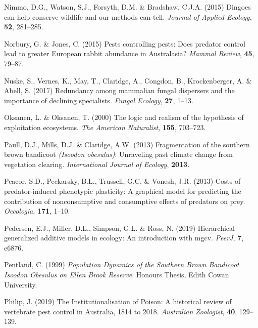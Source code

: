 \documentclass[11pt,a4paper,titlepage,twoside,openright]{style/unimelbthesis}
\begin{document}
\begin{mainmatter}
\leavevmode\hypertarget{ref-nimmo2015dingoes}{}%
Nimmo, D.G., Watson, S.J., Forsyth, D.M. \& Bradshaw, C.J.A. (2015) Dingoes can help conserve wildlife and our methods can tell. \emph{Journal of Applied Ecology}, \textbf{52}, 281--285.

\leavevmode\hypertarget{ref-norbury2015pests}{}%
Norbury, G. \& Jones, C. (2015) Pests controlling pests: Does predator control lead to greater European rabbit abundance in Australasia? \emph{Mammal Review}, \textbf{45}, 79--87.

\leavevmode\hypertarget{ref-nuske2017redundancy}{}%
Nuske, S., Vernes, K., May, T., Claridge, A., Congdon, B., Krockenberger, A. \& Abell, S. (2017) Redundancy among mammalian fungal dispersers and the importance of declining specialists. \emph{Fungal Ecology}, \textbf{27}, 1--13.

\leavevmode\hypertarget{ref-oksanen2000logic}{}%
Oksanen, L. \& Oksanen, T. (2000) The logic and realism of the hypothesis of exploitation ecosystems. \emph{The American Naturalist}, \textbf{155}, 703--723.

\leavevmode\hypertarget{ref-paull2013fragmentation}{}%
Paull, D.J., Mills, D.J. \& Claridge, A.W. (2013) Fragmentation of the southern brown bandicoot \emph{(Isoodon obesulus)}: Unraveling past climate change from vegetation clearing. \emph{International Journal of Ecology}, \textbf{2013}.

\leavevmode\hypertarget{ref-peacor2013costs}{}%
Peacor, S.D., Peckarsky, B.L., Trussell, G.C. \& Vonesh, J.R. (2013) Costs of predator-induced phenotypic plasticity: A graphical model for predicting the contribution of nonconsumptive and consumptive effects of predators on prey. \emph{Oecologia}, \textbf{171}, 1--10.

\leavevmode\hypertarget{ref-pedersen2019hierarchical}{}%
Pedersen, E.J., Miller, D.L., Simpson, G.L. \& Ross, N. (2019) Hierarchical generalized additive models in ecology: An introduction with mgcv. \emph{PeerJ}, \textbf{7}, e6876.

\leavevmode\hypertarget{ref-pentland1999population}{}%
Pentland, C. (1999) \emph{Population Dynamics of the Southern Brown Bandicoot Isoodon Obesulus on Ellen Brook Reserve}. Honours Thesis, Edith Cowan University.

\leavevmode\hypertarget{ref-philip2019institutionalisation}{}%
Philip, J. (2019) The Institutionalisation of Poison: A historical review of vertebrate pest control in Australia, 1814 to 2018. \emph{Australian Zoologist}, \textbf{40}, 129--139.


\end{mainmatter}
\end{document}
